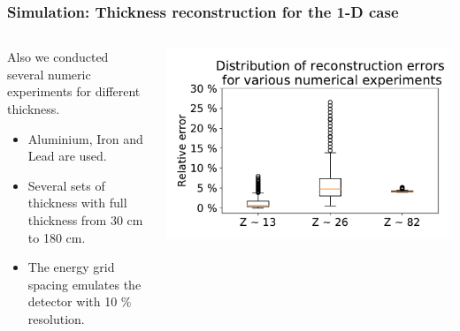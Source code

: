 \documentclass[11pt]{beamer}
\begin{document}
 \begin{frame}
\frametitle{Simulation: Thickness reconstruction for the 1-D case}
\begin{columns}
            \begin{column}{0.4\textwidth}
                Also we conducted several numeric experiments for different thickness.
                \begin{itemize}
                    \item Aluminium, Iron and Lead are used.
                    \item Several sets of thickness with full thickness from 30 cm to 180 cm.
                    \item The energy grid spacing emulates the detector with  10 \% resolution. 
                    
                \end{itemize}
            \end{column}
    \begin{column}{0.7\textwidth} 
        \includegraphics[width=1\textwidth]{figures/relError.pdf}
    \end{column}
\end{columns}  
\end{frame}
\end{document}
